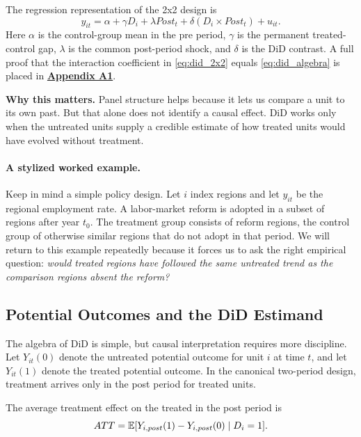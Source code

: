 The regression representation of the 2x2 design is
\begin{equation}
y_{it} = \alpha + \gamma D_i + \lambda Post_t + \delta (D_i \times Post_t) + u_{it}.
\label{eq:did_2x2}
\end{equation}
Here $\alpha$ is the control-group mean in the pre period, $\gamma$ is the permanent treated-control gap, $\lambda$ is the common post-period shock, and $\delta$ is the \ac{DiD} contrast. A full proof that the interaction coefficient in \eqref{eq:did_2x2} equals \eqref{eq:did_algebra} is placed in \hyperlink{app:did-reg}{\textbf{Appendix A1}}.

\begin{boxD}
\textbf{Why this matters.}
Panel structure helps because it lets us compare a unit to its own past. But that alone does not identify a causal effect. \ac{DiD} works only when the untreated units supply a credible estimate of how treated units would have evolved without treatment.
\end{boxD}

\paragraph{A stylized worked example.}
Keep in mind a simple policy design. Let $i$ index regions and let $y_{it}$ be the regional employment rate. A labor-market reform is adopted in a subset of regions after year $t_0$. The treatment group consists of reform regions, the control group of otherwise similar regions that do not adopt in that period. We will return to this example repeatedly because it forces us to ask the right empirical question: \emph{would treated regions have followed the same untreated trend as the comparison regions absent the reform?}

\subsection{Potential Outcomes and the DiD Estimand}
\hypertarget{main:did-po}{}
The algebra of \ac{DiD} is simple, but causal interpretation requires more discipline. Let $Y_{it}(0)$ denote the untreated potential outcome for unit $i$ at time $t$, and let $Y_{it}(1)$ denote the treated potential outcome. In the canonical two-period design, treatment arrives only in the post period for treated units.

\begin{defN}
The average treatment effect on the treated in the post period is
\begin{equation}
ATT
=
\mathbb{E}[Y_{i,post}(1)-Y_{i,post}(0)\mid D_i=1].
\label{eq:att_did}
\end{equation}
\end{defN}

